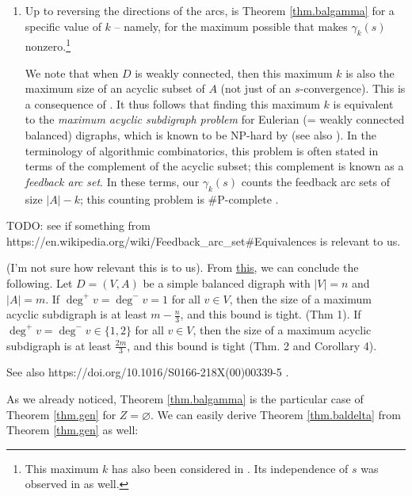 \documentclass[numbers=enddot,12pt,final,onecolumn,notitlepage]{scrartcl}%
\theoremstyle{definition}
\newenvironment{noncompile}{}{}
\theoremstyle{plainsl}
\begin{document}
\begin{enumerate}
\item Up to reversing the directions of the arcs, \cite[Proposition
3.7]{PerPha15} is Theorem \ref{thm.balgamma} for a specific value of $k$ --
namely, for the maximum possible that makes $\gamma_{k}\left(  s\right)  $
nonzero.\footnote{This maximum $k$ has also been considered in \cite[Theorem
1.11]{KalTot23}. Its independence of $s$ was observed in \cite[paragraph below
Theorem 1.9]{KalTot23} as well.}

We note that when $D$ is weakly connected, then this maximum $k$ is also the
maximum size of an acyclic subset of $A$ (not just of an $s$-convergence).
This is a consequence of \cite[Theorem 3.4]{PerPha15}. It thus follows that
finding this maximum $k$ is equivalent to the \emph{maximum acyclic subdigraph
problem} for Eulerian (= weakly connected balanced) digraphs, which is known
to be NP-hard by \cite[Theorem 3.10]{PerPha15} (see also \cite[\S 3.7.1 and
Lemma 4.4.3]{BanGut18}). In the terminology of algorithmic combinatorics, this
problem is often stated in terms of the complement of the acyclic subset; this
complement is known as a \emph{feedback arc set}. In these terms, our
$\gamma_{k}\left(  s\right)  $ counts the feedback arc sets of size
$\left\vert A\right\vert -k$; this counting problem is \#P-complete
\cite[Theorem 5]{Perrot19}.
\end{enumerate}

\begin{noncompile}
TODO: see if something from
https://en.wikipedia.org/wiki/Feedback\_arc\_set\#Equivalences is relevant to us.

(I'm not sure how relevant this is to us). From
\href{https://link.springer.com/chapter/10.1007/978-3-642-45043-3_26}{this},
we can conclude the following. Let $D=(V,A)$ be a simple balanced digraph with
$|V|=n$ and $|A|=m$. If $\deg^{+}v=\deg^{-}v=1$ for all $v\in V$, then the
size of a maximum acyclic subdigraph is at least $m-\frac{n}{3}$, and this
bound is tight. (Thm 1). If $\deg^{+}v=\deg^{-}v\in\{1,2\}$ for all $v\in V$,
then the size of a maximum acyclic subdigraph is at least $\frac{2m}{3}$, and
this bound is tight (Thm. 2 and Corollary 4).

See also https://doi.org/10.1016/S0166-218X(00)00339-5 .
\end{noncompile}

As we already noticed, Theorem \ref{thm.balgamma} is the particular case of
Theorem \ref{thm.gen} for $Z=\varnothing$. We can easily derive Theorem
\ref{thm.baldelta} from Theorem \ref{thm.gen} as well:
\end{document}
